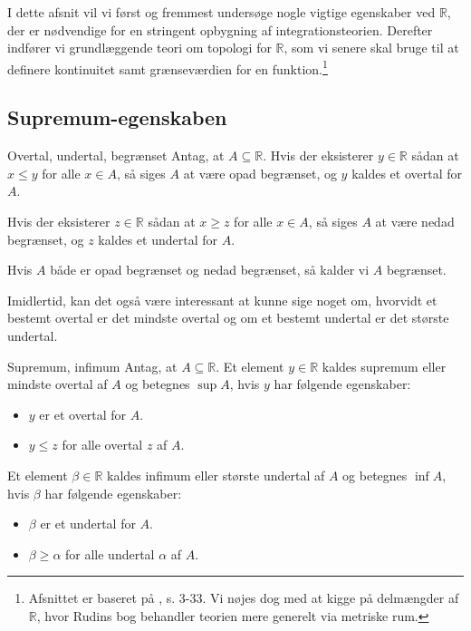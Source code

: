 I dette afsnit vil vi først og fremmest undersøge nogle vigtige egenskaber ved $\mathbb{R}$, der er nødvendige for en stringent opbygning af integrationsteorien.
Derefter indfører vi grundlæggende teori om topologi for $\mathbb{R}$, som vi senere skal bruge til at definere kontinuitet samt grænseværdien for en funktion.\footnote{Afsnittet er baseret på \cite{Rudin1976}, s. 3-33. Vi nøjes dog med at kigge på delmængder af $\mathbb{R}$, hvor Rudins bog behandler teorien mere generelt via metriske rum.}

\subsection{Supremum-egenskaben}%
  \label{sub:Supremum-egenskaben}

\begin{definition}[label=def:overtal]{Overtal, undertal, begrænset}{}
  Antag, at $A \subseteq \mathbb{R}$. 
  Hvis der eksisterer $y \in \mathbb{R}$ sådan at $x \leq y$ for alle $x \in A$, så siges $A$ at være opad begrænset, og $y$ kaldes et overtal for $A$. 

  Hvis der eksisterer $z \in \mathbb{R}$ sådan at $x \geq z$ for alle $x \in A$, så siges $A$ at være nedad begrænset, og $z$ kaldes et undertal for $A$. 

  Hvis $A$ både er opad begrænset og nedad begrænset, så kalder vi $A$ begrænset. 
\end{definition}

Imidlertid, kan det også være interessant at kunne sige noget om, hvorvidt et bestemt overtal er det mindste overtal og om et bestemt undertal er det største undertal.

\begin{definition}[label=def:sup]{Supremum, infimum}{}
  Antag, at $A \subseteq \mathbb{R}$. Et element $y \in \mathbb{R}$ kaldes supremum eller mindste overtal af $A$ og betegnes $\sup A$, hvis $y$ har følgende egenskaber:
  \begin{itemize}
    \item $y$ er et overtal for $A$.
    \item $y \leq z$ for alle overtal $z$ af $A$. 
  \end{itemize}
  Et element $\beta \in \mathbb{R}$ kaldes infimum eller største undertal af $A$ og betegnes $\inf A$, hvis $\beta$ har følgende egenskaber:
  \begin{itemize}
    \item $\beta$ er et undertal for $A$.
    \item $\beta \geq \alpha$ for alle undertal $\alpha$ af $A$. 
  \end{itemize}
\end{definition}

